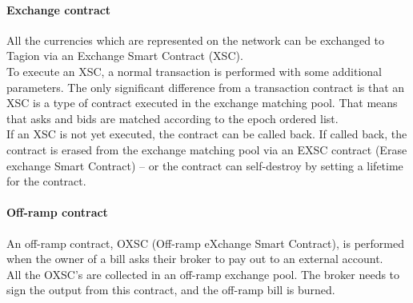 \paragraph{Exchange contract\\}
All the currencies which are represented on the network can be exchanged to Tagion via an Exchange Smart Contract (XSC). \\
To execute an XSC, a normal transaction is performed with some additional parameters. The only significant difference from a transaction contract is that an XSC is a type of contract executed in the exchange matching pool. That means that asks and bids are matched according to the epoch ordered list. \\
If an XSC is not yet executed, the contract can be called back. If called back, the contract is erased from the exchange matching pool via an EXSC contract (Erase exchange Smart Contract) – or the contract can self-destroy by setting a lifetime for the contract. \\
\paragraph{Off-ramp contract\\}
An off-ramp contract, OXSC (Off-ramp eXchange Smart Contract), is performed when the owner of a bill asks their broker to pay out to an external account. \\
All the OXSC’s are collected in an off-ramp exchange pool. The broker needs to sign the output from this contract, and the off-ramp bill is burned.
